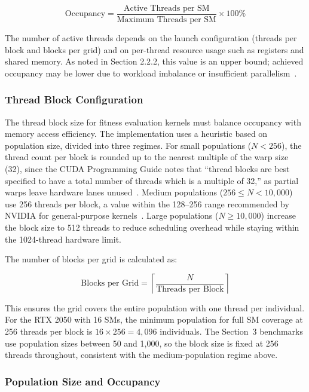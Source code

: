   \begin{equation}
      \text{Occupancy} = \frac{\text{Active Threads per SM}}{\text{Maximum Threads per SM}} \times 100\%
  \end{equation}

  The number of active threads depends on the launch configuration (threads per block and blocks per grid) and on per-thread resource usage such as registers and shared memory. As noted in Section 2.2.2, this value is an upper bound; achieved occupancy may be lower due to workload imbalance or insufficient parallelism~\cite{nvidia2024occupancy}.

  \subsubsection*{Thread Block Configuration}

  The thread block size for fitness evaluation kernels must balance occupancy with memory access efficiency. The implementation uses a heuristic based on population size, divided into three regimes. For small populations ($N < 256$), the thread count per block is rounded up to the nearest multiple of the warp size (32), since the CUDA Programming Guide notes that ``thread blocks are best specified to have a total number of threads which is a multiple of 32,'' as partial warps leave hardware lanes unused~\cite{nvidia2025cudaguide}. Medium populations ($256 \leq N < 10{,}000$) use 256 threads per block, a value within the 128--256 range recommended by NVIDIA for general-purpose kernels~\cite{nvidia_occupancy}. Large populations ($N \geq 10{,}000$) increase the block size to 512 threads to reduce scheduling overhead while staying within the 1024-thread hardware limit.

  The number of blocks per grid is calculated as:

  \begin{equation}
      \text{Blocks per Grid} = \left\lceil \frac{N}{\text{Threads per Block}} \right\rceil
  \end{equation}

  This ensures the grid covers the entire population with one thread per individual. For the RTX 2050 with 16 SMs, the minimum population for full SM coverage at 256 threads per block is $16 \times 256 = 4{,}096$ individuals. The Section~3 benchmarks use population sizes between 50 and 1{,}000, so the block size is fixed at 256 threads throughout, consistent with the medium-population regime above.

  \subsubsection*{Population Size and Occupancy}

